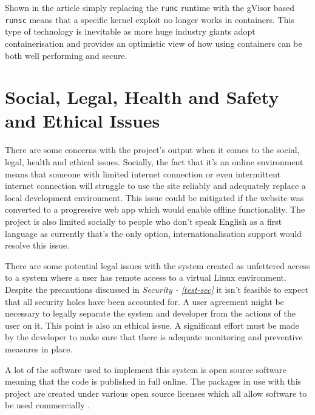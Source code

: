 \documentclass[12pt, a4paper]{extreport}
\begin{document}
Shown in the article \cite{gvisor-info} simply replacing the \texttt{runc} runtime with the gVisor based \texttt{runsc} means that a specific kernel exploit no longer works in containers. This type of technology is inevitable as more huge industry giants adopt containerisation and provides an optimistic view of how using containers can be both well performing and secure.

\pagebreak


\chapter{Social, Legal, Health and Safety and Ethical Issues}


There are some concerns with the project's output when it comes to the social, legal, health and ethical issues. Socially, the fact that it's an online environment means that someone with limited internet connection or even intermittent internet connection will struggle to use the site reliably and adequately replace a local development environment. This issue could be mitigated if the website was converted to a progressive web app which would enable offline functionality. The project is also limited socially to people who don't speak English as a first language as currently that's the only option, internationalisation support would resolve this issue.

There are some potential legal issues with the system created as unfettered access to a system where a user has remote access to a virtual Linux environment. Despite the precautions discussed in \textit{Security - \ref{test-sec}} it isn't feasible to expect that all security holes have been accounted for. A user agreement might be necessary to legally separate the system and developer from the actions of the user on it. This point is also an ethical issue. A significant effort must be made by the developer to make sure that there is adequate monitoring and preventive measures in place.

A lot of the software used to implement this system is open source software meaning that the code is published in full online. The packages in use with this project are created under various open source licenses which all allow software to be used commercially \cite{opensource-licenses}.
\end{document}
